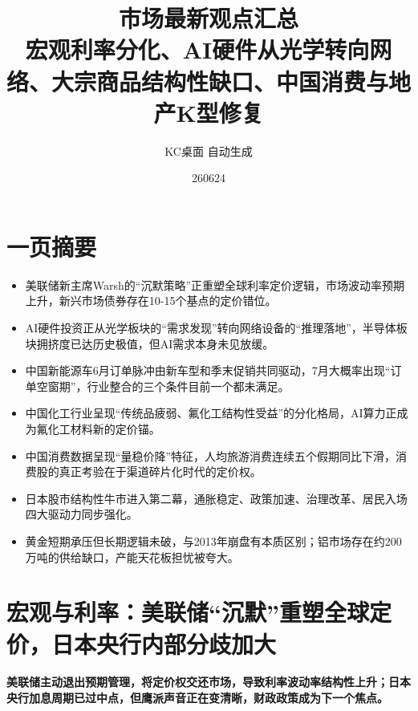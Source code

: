\documentclass[11pt]{ctexart}
\title{\textbf{市场最新观点汇总}\\[0.4em]{\large 宏观利率分化、AI硬件从光学转向网络、大宗商品结构性缺口、中国消费与地产K型修复}}
\author{KC桌面 自动生成}
\date{260624}
\begin{document}
\maketitle
\tableofcontents
\newpage
\section{一页摘要}
\begin{itemize}
  \item 美联储新主席Warsh的“沉默策略”正重塑全球利率定价逻辑，市场波动率预期上升，新兴市场债券存在10-15个基点的定价错位。
  \item AI硬件投资正从光学板块的“需求发现”转向网络设备的“推理落地”，半导体板块拥挤度已达历史极值，但AI需求本身未见放缓。
  \item 中国新能源车6月订单脉冲由新车型和季末促销共同驱动，7月大概率出现“订单空窗期”，行业整合的三个条件目前一个都未满足。
  \item 中国化工行业呈现“传统品疲弱、氟化工结构性受益”的分化格局，AI算力正成为氟化工材料新的定价锚。
  \item 中国消费数据呈现“量稳价降”特征，人均旅游消费连续五个假期同比下滑，消费股的真正考验在于渠道碎片化时代的定价权。
  \item 日本股市结构性牛市进入第二幕，通胀稳定、政策加速、治理改革、居民入场四大驱动力同步强化。
  \item 黄金短期承压但长期逻辑未破，与2013年崩盘有本质区别；铝市场存在约200万吨的供给缺口，产能天花板担忧被夸大。
\end{itemize}
\section{宏观与利率：美联储“沉默”重塑全球定价，日本央行内部分歧加大}
\textbf{美联储主动退出预期管理，将定价权交还市场，导致利率波动率结构性上升；日本央行加息周期已过中点，但鹰派声音正在变清晰，财政政策成为下一个焦点。}
\end{document}
